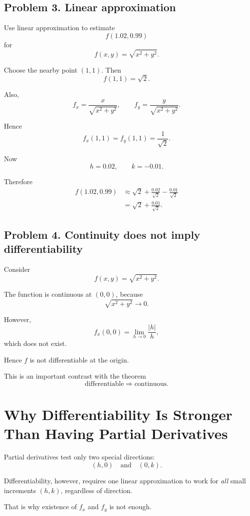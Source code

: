 \documentclass[11pt,oneside]{book}
\theoremstyle{studentthm}
\theoremstyle{definition}
\begin{document}
\subsection*{Problem 3. Linear approximation}

Use linear approximation to estimate
\[
f(1.02,0.99)
\]
for
\[
f(x,y)=\sqrt{x^2+y^2}.
\]

Choose the nearby point \((1,1)\). Then
\[
f(1,1)=\sqrt2.
\]

Also,
\[
f_x=\frac{x}{\sqrt{x^2+y^2}},
\qquad
f_y=\frac{y}{\sqrt{x^2+y^2}}.
\]

Hence
\[
f_x(1,1)
=
f_y(1,1)
=
\frac1{\sqrt2}.
\]

Now
\[
h=0.02,\qquad k=-0.01.
\]

Therefore
\[
\begin{aligned}
f(1.02,0.99)
&\approx
\sqrt2
+
\frac{0.02}{\sqrt2}
-
\frac{0.01}{\sqrt2}\\
&=
\sqrt2+\frac{0.01}{\sqrt2}.
\end{aligned}
\]

\subsection*{Problem 4. Continuity does not imply differentiability}

Consider
\[
f(x,y)=\sqrt{x^2+y^2}.
\]

The function is continuous at \((0,0)\), because
\[
\sqrt{x^2+y^2}\to0.
\]

However,
\[
f_x(0,0)
=
\lim_{h\to0}
\frac{|h|}{h},
\]
which does not exist.

Hence \(f\) is not differentiable at the origin.

This is an important contrast with the theorem
\[
\text{differentiable}\Longrightarrow\text{continuous}.
\]



\section{Why Differentiability Is Stronger Than Having Partial Derivatives}

Partial derivatives test only two special directions:
\[
(h,0)
\quad\text{and}\quad
(0,k).
\]

Differentiability, however, requires one linear approximation to work
for \emph{all} small increments \((h,k)\), regardless of direction.

That is why existence of \(f_x\) and \(f_y\) is not enough.
\end{document}
